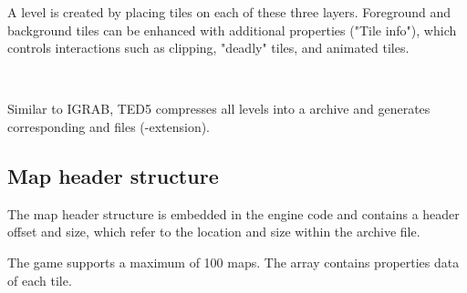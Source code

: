\documentclass[book.tex]{subfiles}
\begin{document}
A level is created by placing tiles on each of these three layers. Foreground and background tiles can be enhanced with additional properties ("Tile info"), which controls interactions such as clipping, "deadly" tiles, and animated tiles. \\

\par
{}\\
 
\par
Similar to IGRAB, TED5 compresses all levels into a  archive and generates corresponding  and  files (-extension).\\

 
\subsection{Map header structure}
The map header structure is embedded in the engine code and contains a header offset and size, which refer to the location and size within the  archive file. \\

\par
\begin{minipage}{\textwidth}
 \par
 \end{minipage}

The game supports a maximum of 100 maps. The  array contains properties data of each tile.
 
\end{document}

